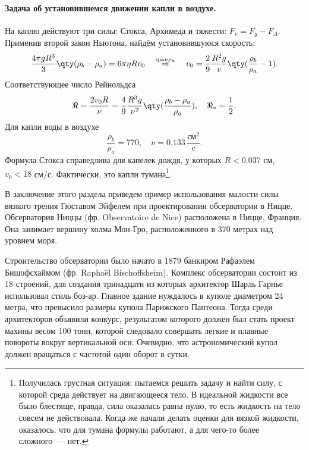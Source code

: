 \paragraph{Задача об установившемся движении капли в воздухе. } На каплю действуют три силы: Стокса, Архимеда и тяжести: $F_v=F_g-F_A$. Применив второй закон Ньютона, найдём установившуюся скорость:
\begin{equation}
	\frac{4\pi g R^3}{3}\qty(\rho_b-\rho_a) = 6\pi \eta R v_0 \quad \overset{\eta=\nu \rho_a}{\Rightarrow} \quad
	v_0 = \frac{2}{9} \frac{R^2 g}{v}\qty(\frac{\rho_b}{\rho_a}-1).
\end{equation}
Соответствующее число Рейнольдса
\begin{equation}
	\Re = \frac{2v_0 R}{\nu} = \frac49 \frac{R^3 g}{\nu^2}\qty(\frac{\rho_b-\rho_a}{\rho_a}), \quad \Re_*=\frac{1}{2}.
\end{equation}
Для капли воды в воздухе
\begin{equation}
	\frac{\rho_b}{\rho_a} = 770,\quad \nu=0.133 \,\frac{\text{см}^2}{\text{c}}.
\end{equation}
Формула Стокса справедлива для капелек дождя, у которых $R<0.037$ см, $v_0 < 18 $ см/с. Фактически, это капли тумана\footnote{Получилась грустная ситуация: пытаемся решить задачу и найти силу, с которой среда действует на двигающееся тело.
В идеальной жидкости все было блестяще, правда, сила оказалась равна нулю, то есть жидкость на тело совсем не действовала. Когда же начали делать оценки для  вязкой жидкости, оказалось, что для тумана  формулы работают, а для чего-то более сложного~--- нет.}.

В заключение этого раздела приведем пример использования малости силы вязкого трения Гюставом Эйфелем при проектировании обсерватории в Ницце.
Обсерватория Ниццы (фр. Observatoire de Nice) расположена в Ницце, Франция. Она занимает  вершину холма Мон-Гро, расположенного в 370 метрах над уровнем моря.

Строительство обсерватории было начато в 1879 банкиром Рафаэлем Бишофсхаймом (фр. Raphaël Bischoffsheim). Комплекс обсерватории состоит из 18 строений, для создания тринадцати из которых архитектор Шарль Гарнье использовал стиль боз-ар. Главное здание нуждалось в куполе диаметром 24 метра, что превысило размеры купола Парижского Пантеона.  Тогда среди архитекторов объявили конкурс, результатом которого должен был стать проект махины весом 100 тонн,  которой следовало совершать легкие и плавные повороты вокруг вертикальной оси. Очевидно, что  астрономический купол должен  вращаться с частотой один оборот в сутки.

